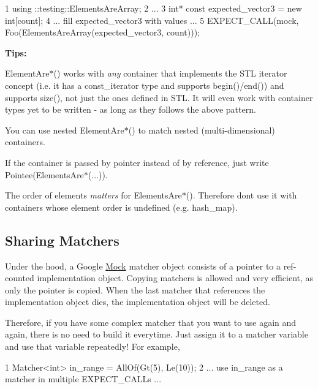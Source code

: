 \begin{DoxyCode}
1 using ::testing::ElementsAreArray;
2 ...
3   int* const expected\_vector3 = new int[count];
4   ... fill expected\_vector3 with values ...
5   EXPECT\_CALL(mock, Foo(ElementsAreArray(expected\_vector3, count)));
\end{DoxyCode}


{\bfseries Tips\+:}


\begin{DoxyItemize}
\item {\ttfamily Element\+Are$\ast$()} works with {\itshape any} container that implements the S\+TL iterator concept (i.\+e. it has a {\ttfamily const\+\_\+iterator} type and supports {\ttfamily begin()/end()}) and supports {\ttfamily size()}, not just the ones defined in S\+TL. It will even work with container types yet to be written -\/ as long as they follows the above pattern.
\item You can use nested {\ttfamily Element\+Are$\ast$()} to match nested (multi-\/dimensional) containers.
\item If the container is passed by pointer instead of by reference, just write {\ttfamily Pointee(Elements\+Are$\ast$(...))}.
\item The order of elements {\itshape matters} for {\ttfamily Elements\+Are$\ast$()}. Therefore don\textquotesingle{}t use it with containers whose element order is undefined (e.\+g. {\ttfamily hash\+\_\+map}).
\end{DoxyItemize}

\subsection*{Sharing Matchers}

Under the hood, a Google \hyperlink{classMock}{Mock} matcher object consists of a pointer to a ref-\/counted implementation object. Copying matchers is allowed and very efficient, as only the pointer is copied. When the last matcher that references the implementation object dies, the implementation object will be deleted.

Therefore, if you have some complex matcher that you want to use again and again, there is no need to build it everytime. Just assign it to a matcher variable and use that variable repeatedly! For example,


\begin{DoxyCode}
1 Matcher<int> in\_range = AllOf(Gt(5), Le(10));
2 ... use in\_range as a matcher in multiple EXPECT\_CALLs ...
\end{DoxyCode}


